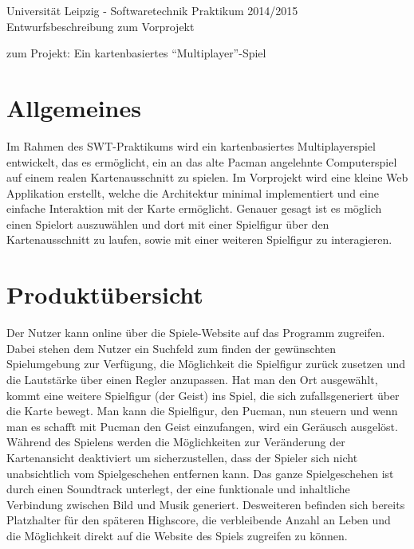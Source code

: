 \documentclass[11pt,a4paper]{article}
\begin{document}
\center \large Universität Leipzig - Softwaretechnik Praktikum 2014/2015\\
\center \Huge Entwurfsbeschreibung zum Vorprojekt \\
\par\bigskip

\small zum Projekt: Ein kartenbasiertes “Multiplayer”-Spiel

\par\bigskip

\tableofcontents

\clearpage

\flushleft
\section{Allgemeines}
Im Rahmen des SWT-Praktikums wird ein kartenbasiertes Multiplayerspiel entwickelt, das es ermöglicht, ein an das alte Pacman angelehnte Computerspiel auf einem realen Kartenausschnitt zu spielen.
Im Vorprojekt wird eine kleine Web Applikation erstellt, welche die Architektur minimal implementiert und eine einfache Interaktion mit der Karte ermöglicht.
Genauer gesagt ist es möglich einen Spielort auszuwählen und dort mit einer Spielfigur über den Kartenausschnitt zu laufen, sowie mit einer weiteren Spielfigur zu interagieren.

\section{Produktübersicht}
Der Nutzer kann online über die Spiele-Website auf das Programm zugreifen.
Dabei stehen dem Nutzer ein Suchfeld zum finden der gewünschten Spielumgebung zur Verfügung, die Möglichkeit die Spielfigur zurück zusetzen und die Lautstärke über einen Regler anzupassen.
Hat man den Ort ausgewählt, kommt eine weitere Spielfigur (der Geist) ins Spiel, die sich zufallsgeneriert über die Karte bewegt.
Man kann die Spielfigur, den Pucman, nun steuern und wenn man es schafft mit Pucman den Geist einzufangen, wird ein Geräusch ausgelöst.
Während des Spielens werden die Möglichkeiten zur Veränderung der Kartenansicht deaktiviert um sicherzustellen, dass der Spieler sich nicht unabsichtlich vom Spielgeschehen entfernen kann.
Das ganze Spielgeschehen ist durch einen Soundtrack unterlegt, der eine  funktionale und inhaltliche Verbindung zwischen Bild und Musik  generiert.
Desweiteren befinden sich bereits Platzhalter für den späteren Highscore, die verbleibende Anzahl an Leben und die Möglichkeit direkt auf die Website des Spiels zugreifen zu können.
\end{document}

